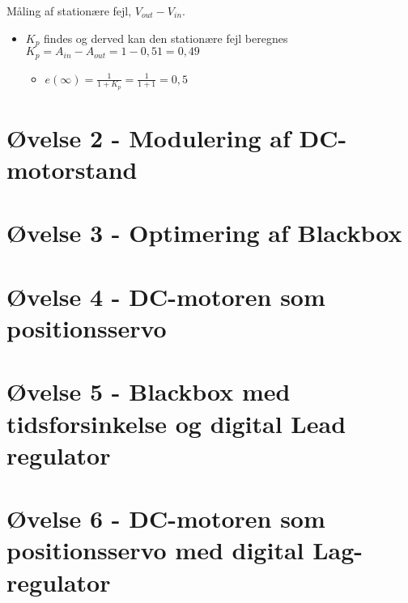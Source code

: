 \documentclass[danish]{article}
\begin{document}
Måling af stationære fejl, $V_{out} - V_{in}$. 
\begin{itemize}
	\item $K_p$ findes og derved kan den stationære fejl beregnes $K_p = A_{in}-A_{out} = 1 - 0,51 = 0,49$
	\begin{itemize}
		\item $ e(\infty)= \frac{1}{1+K_p} = \frac{1}{1+1} = 0,5$
	\end{itemize}
\end{itemize}


\section{Øvelse 2 -	Modulering af DC-motorstand}

\section{Øvelse 3 - Optimering af Blackbox}

\section{Øvelse 4 - DC-motoren som positionsservo}

\section{Øvelse 5 - Blackbox med tidsforsinkelse og digital Lead regulator}

\section{Øvelse 6 - DC-motoren som positionsservo med digital Lag- regulator}
\end{document}
